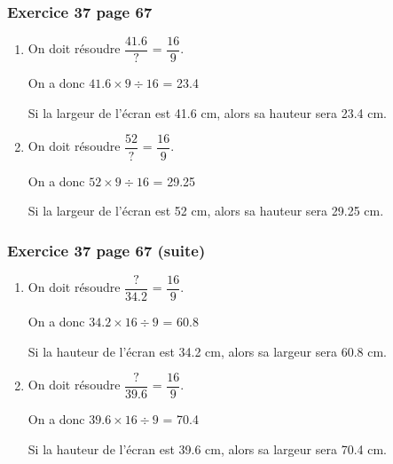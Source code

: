 \documentclass[xcolor={dvipsnames}, handout]{beamer}
\begin{document}
\begin{frame}
	\frametitle{Exercice 37 page 67}
	
	\begin{Large}
		\begin{enumerate}
			
			\item On doit résoudre $\dfrac{\num{41.6}}{?} $ = $\dfrac{16}{9}$. \pause %
			
			On a donc $\num{41.6} \times 9 \div 16 $ \pause = \num{23.4} %
			
			Si la largeur de l'écran est \num{41.6} cm, alors sa hauteur sera \num{23.4} cm.
			
			\vspace*{1cm}
			
			\item On doit résoudre $\dfrac{\num{52}}{?} $ = $\dfrac{16}{9}$. %
			
			On a donc $\num{52} \times 9 \div 16 $  = \num{29.25} %
			
			Si la largeur de l'écran est \num{52} cm, alors sa hauteur sera \num{29.25} cm.
			
			
		\end{enumerate}
	\end{Large}
	
\end{frame}


\begin{frame}
	\frametitle{Exercice 37 page 67 (suite)}
	
	\begin{Large}
		\begin{enumerate}
			

			
			\item On doit résoudre $\dfrac{?}{\num{34.2}} $ = $\dfrac{16}{9}$. \pause %
			
			On a donc $\num{34.2} \times 16 \div 9 $ \pause = \num{60.8} %
			
			Si la hauteur de l'écran est \num{34.2} cm, alors sa largeur sera \num{60.8} cm.
			
			\vspace*{1cm}
			
			\item On doit résoudre $\dfrac{?}{\num{39.6}} $ = $\dfrac{16}{9}$. %
			
			On a donc $\num{39.6} \times 16 \div 9 $ = \num{70.4} %
			
			Si la hauteur de l'écran est \num{39.6} cm, alors sa largeur sera \num{70.4} cm.
		\end{enumerate}
	\end{Large}
	
\end{frame}
\end{document}
